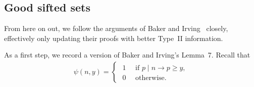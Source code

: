 \documentclass{amsart}
\numberwithin{equation}{section}
\begin{document}
\subsection{Good sifted sets}
From here on out, we  follow the arguments of Baker and Irving~\cite{Baker:2017:BIP} closely, effectively only updating their proofs with better Type~II information. 

\vspace{3mm}
 As a first step, we record a version of Baker and Irving's Lemma~7. Recall that \begin{align*}
\psi(n,y) = \begin{cases} 
\,\, 1  \quad \mbox{ if } p \mid n \rightarrow p \geq y, \\ \,\, 0 \quad \mbox{ otherwise. }
\end{cases}
\end{align*}
\end{document}
